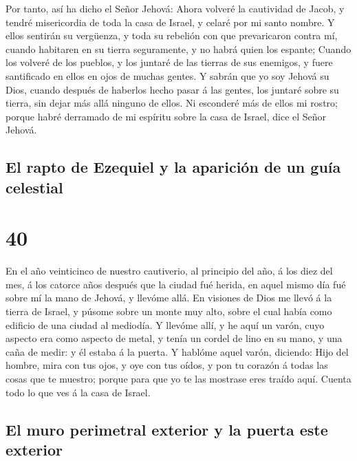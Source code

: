  Por tanto, así ha dicho el Señor Jehová: Ahora volveré la
cautividad de Jacob, y tendré misericordia de toda la casa de Israel, y
celaré por mi santo nombre.  Y ellos sentirán su vergüenza,
y toda su rebelión con que prevaricaron contra mí, cuando habitaren en
su tierra seguramente, y no habrá quien los espante; 
Cuando los volveré de los pueblos, y los juntaré de las tierras de sus
enemigos, y fuere santificado en ellos en ojos de muchas gentes.
 Y sabrán que yo soy Jehová su Dios, cuando después de
haberlos hecho pasar á las gentes, los juntaré sobre su tierra, sin
dejar más allá ninguno de ellos.  Ni esconderé más de ellos
mi rostro; porque habré derramado de mi espíritu sobre la casa de
Israel, dice el Señor Jehová.

\hypertarget{el-rapto-de-ezequiel-y-la-apariciuxf3n-de-un-guuxeda-celestial}{%
\subsection{El rapto de Ezequiel y la aparición de un guía
celestial}\label{el-rapto-de-ezequiel-y-la-apariciuxf3n-de-un-guuxeda-celestial}}

\hypertarget{section-39}{%
\section{40}\label{section-39}}

 En el año veinticinco de nuestro cautiverio, al principio
del año, á los diez del mes, á los catorce años después que la ciudad
fué herida, en aquel mismo día fué sobre mí la mano de Jehová, y llevóme
allá.  En visiones de Dios me llevó á la tierra de Israel, y
púsome sobre un monte muy alto, sobre el cual había como edificio de una
ciudad al mediodía.  Y llevóme allí, y he aquí un varón,
cuyo aspecto era como aspecto de metal, y tenía un cordel de lino en su
mano, y una caña de medir: y él estaba á la puerta.  Y
hablóme aquel varón, diciendo: Hijo del hombre, mira con tus ojos, y oye
con tus oídos, y pon tu corazón á todas las cosas que te muestro; porque
para que yo te las mostrase eres traído aquí. Cuenta todo lo que ves á
la casa de Israel.

\hypertarget{el-muro-perimetral-exterior-y-la-puerta-este-exterior}{%
\subsection{El muro perimetral exterior y la puerta este
exterior}\label{el-muro-perimetral-exterior-y-la-puerta-este-exterior}}

